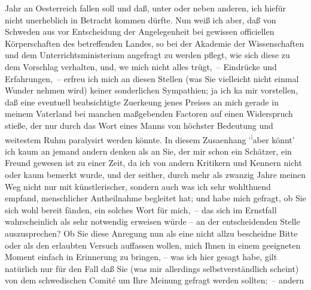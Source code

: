 \begin{ledgroupsized}[t]{13cm}
               Jahr an Oesterreich fallen soll und daß, unter
               oder neben anderen, ich hiefür nicht unerheblich in Betracht kommen dürfte. Nun weiß
               ich aber, daß von Schweden aus vor Entscheidung
               der Angelegenheit bei gewissen officiellen Körperschaften des betreffenden Landes, so
               bei der Akademie der Wissenschaften und dem Unterrichtsministerium angefragt zu werden pflegt,
               wie sich diese zu dem {\pb}Vorschlag verhalten, und,
                  we{\geminationn} mich nicht alles trügt, – Eindrücke und
               Erfahrungen, – erfreu ich mich an diesen Stellen (was Sie vielleicht nicht einmal
               Wunder nehmen wird) keiner sonderlichen Sympathien; ja ich ka{\geminationn} mir vorstellen, daß eine eventuell beabsichtigte
                  Zuerke{\geminationn}ung jenes Preises an mich gerade in meinem
               Vaterland bei manchen maßgebenden Factoren auf einen Widerspruch stieße, der nur
               durch das Wort eines Manns von höchster Bedeutung und weitestem Ruhm paralysirt
               werden könnte. In diesem Zusa{\geminationm}enhang \substVorne{}\textsuperscript{\textcolor{gray}{d}}\substDazwischen{}a\substHinten{}ber könnt’ ich kaum an jemand andern denken als an Sie, der mir schon ein
               Schätzer, ein {\pb}Freund gewesen ist zu einer Zeit,
               da ich von andern Kritikern und Kennern nicht oder kaum bemerkt wurde, und der
               seither, durch mehr als zwanzig Jahre meinen Weg nicht nur mit künstlerischer,
               sondern \introOben{}auch\introOben{} was ich sehr wohlthuend empfand, menschlicher
               Antheilnahme begleitet hat; und habe mich gefragt, ob Sie sich wohl bereit fänden,
               ein solches Wort für mich, – das sich im Ernstfall wahrscheinlich als sehr notwendig
               erweisen würde – an der entscheidenden Stelle auszusprechen? Ob Sie \introOben{}\introOben{} diese Anregung nun als eine nicht allzu bescheidne Bitte oder als den
               erlaubten Versuch auffassen wollen, mich Ihnen in einem geeigneten Moment einfach in
               Erinnerung zu bringen, {\pb}– was ich hier gesagt
               habe, gilt natürlich nur für den Fall daß Sie (was mir allerdings selbstverständlich
               scheint) von dem schwedischen Comité um Ihre Meinung gefragt werden sollten; – andern

\end{ledgroupsized}
